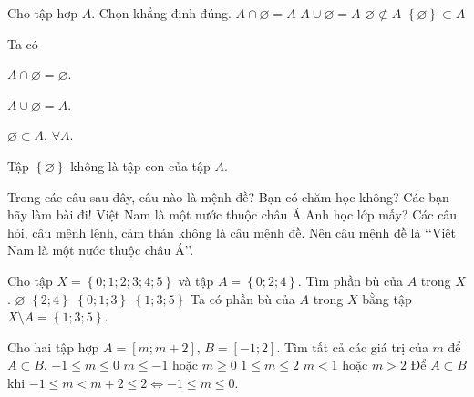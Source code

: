 \begin{ex}%
Cho tập hợp $ A $. Chọn khẳng định đúng.	
	\choice
	{$ A\cap \varnothing = A $}
	{\True $ A \cup \varnothing = A $}
	{$\varnothing\not\subset A$}
	{$\left\lbrace \varnothing\right\rbrace\subset A$}
	\loigiai
	{
Ta có 
\begin{itemize}
\begin{multicols}{2}
		\item $ A\cap \varnothing = \varnothing $.
	\item $ A\cup \varnothing=A $.
	\item $\varnothing\subset A, \, \forall A$.
	\item Tập $ \left\lbrace \varnothing \right\rbrace  $ không là tập con của tập $ A $.
\end{multicols}

\end{itemize}		
	}
\end{ex}
\begin{ex}%
Trong các câu sau đây, câu nào là mệnh đề?	
	\choice
	{Bạn có chăm học không?}
	{Các bạn hãy làm bài đi!}
	{\True Việt Nam là một nước thuộc châu Á}
	{Anh học lớp mấy?}
	\loigiai
	{
Các câu hỏi, câu mệnh lệnh, cảm thán không là câu mệnh đề. Nên câu mệnh đề là \lq\lq Việt Nam là một nước thuộc châu Á\rq\rq.  		
	}
\end{ex}
\begin{ex}%
Cho tập $ X=\left\lbrace 0;1;2;3;4;5 \right\rbrace$ và tập $ A=\left\lbrace 0;2;4 \right\rbrace  $. Tìm phần bù của $ A $ trong $ X $.	
	\choice
	{$ \varnothing $}
	{$ \left\lbrace 2;4 \right\rbrace $ }
	{$ \left\lbrace 0;1;3 \right\rbrace  $}
	{\True $ \left\lbrace 1;3;5 \right\rbrace  $}
	\loigiai
	{
Ta có phần bù của $ A $ trong $ X $ bằng tập $ X\setminus A=\left\lbrace 1;3;5 \right\rbrace  $.	
	}
\end{ex}
\begin{ex}%
Cho hai tập hợp $ A=[m;m+2] $, $ B=[-1;2] $. Tìm tất cả các giá trị của $ m $ để $ A\subset B $.	
	\choice
	{\True $ -1\leq m \leq 0 $}
	{$ m \leq -1 $ hoặc $ m\geq 0 $}
	{$ 1 \leq m \leq2$}
	{$ m<1 $ hoặc $ m>2 $}
	\loigiai
	{
Để $ A\subset B $ khi $ -1\leq m < m+2 \leq 2\Leftrightarrow -1 \leq m \leq 0 $.}
\end{ex}
